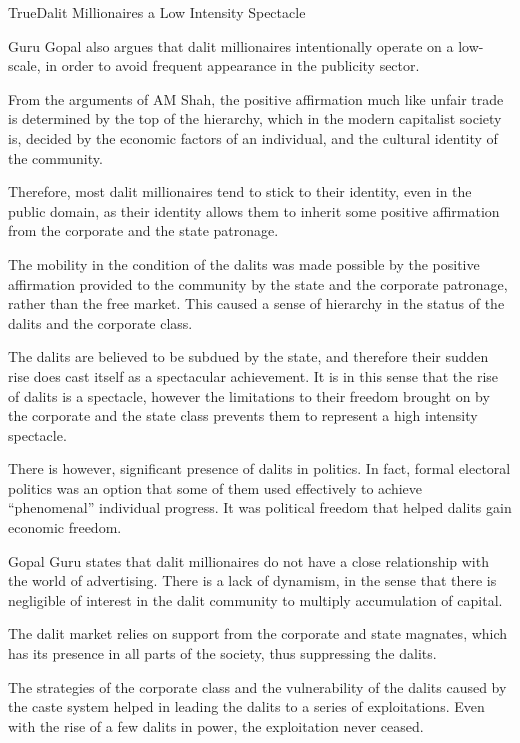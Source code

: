 \documentclass[11pt]{article}
\begin{document}
\begin{heading}{True}{}{Dalit Millionaires a Low Intensity Spectacle}
\begin{enumerate}[label=\bt{\theenumi.}]

		Guru Gopal also argues that dalit millionaires intentionally operate on a low-scale, in order to avoid frequent appearance in the publicity sector.

		From the arguments of AM Shah, the positive affirmation much like unfair trade is determined by the top of the hierarchy, which in the modern capitalist society is, decided by the economic factors of an individual, and the cultural identity of the community.

		Therefore, most dalit millionaires tend to stick to their identity, even in the public domain, as their identity allows them to inherit some positive affirmation from the corporate and the state patronage.


		The mobility in the condition of the dalits was made possible by the positive affirmation provided to the community by the state and the corporate patronage, rather than the free market. This caused a sense of hierarchy in the status of the dalits and the corporate class.

		The dalits are believed to be subdued by the state, and therefore their sudden rise does cast itself as a spectacular achievement. It is in this sense that the rise of dalits is a spectacle, however the limitations to their freedom brought on by the corporate and the state class prevents them to represent a high intensity spectacle.

		There is however, significant presence of dalits in politics. In fact, formal electoral politics was an option that some of them used effectively to achieve “phenomenal” individual progress. It was political freedom that helped dalits gain economic freedom.


		Gopal Guru states that dalit millionaires do not have a close relationship with the world of advertising. There is a lack of dynamism, in the sense that there is negligible of interest in the dalit community to multiply accumulation of capital.

		The dalit market relies on support from the corporate and state magnates, which has its presence in all parts of the society, thus suppressing the dalits.


		The strategies of the corporate class and the vulnerability of the dalits caused by the caste system helped in leading the dalits to a series of exploitations. Even with the rise of a few dalits in power, the exploitation never ceased.


\end{enumerate}
\end{heading}
\end{document}
